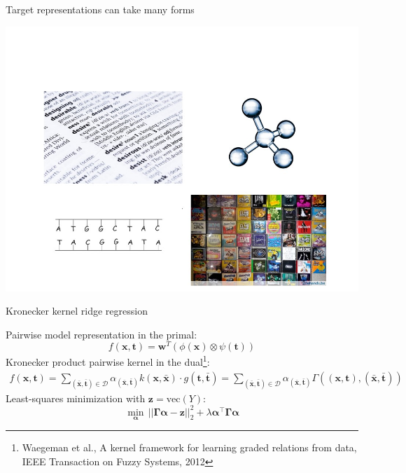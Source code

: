 \documentclass[]{beamer}
\newcommand{\kkernelm}{\bm{\Gamma}}
\newcommand{\regparam}{\lambda}
\newcommand{\transpose}{^\intercal}
\newcommand{\bm}[1]{\mathbf{#1}}
\renewcommand{\vec}[1]{\boldsymbol{#1}}
\begin{document}
\begin{frame}{Target representations can take many forms}

\begin{center}
\includegraphics[width=\textwidth,trim = 0 0 0 90,clip]{Figures/representations}
\end{center}

\end{frame}

\begin{frame}{Kronecker kernel ridge regression}

\vspace{0.5cm}
Pairwise model representation in the primal: 
\begin{equation*}
\label{eq:pairwise}
f(\vec{x},\vec{t}) = \vec{w}^T \left(\phi(\vec{x}) \otimes \psi(\vec{t}) \right) 
\end{equation*}
Kronecker product pairwise kernel in the dual\footnote{Waegeman et al., A kernel framework for learning graded relations from data, IEEE Transaction on Fuzzy Systems, 2012}:
\begin{eqnarray*} 
f(\vec{x},\vec{t})= \sum_{(\bar{\vec{x}},\bar{\vec{t}}) \in \mathcal{D}} \alpha_{(\bar{\vec{x}},\bar{\vec{t}})}  k(\vec{x},\bar{\vec{x}}) \cdot g(\vec{t},\bar{\vec{t}})  = \sum_{(\bar{\vec{x}},\bar{\vec{t}}) \in \mathcal{D}} \alpha_{(\bar{\vec{x}},\bar{\vec{t}})} \Gamma((\vec{x},\vec{t}),(\bar{\vec{x}},\bar{\vec{t}})) 
\end{eqnarray*}
Least-squares minimization with 
$\bm{z} = \textrm{vec}{(Y)}$: 
$$ \min_{\bm{\boldsymbol\alpha}} \, ||\bm{\kkernelm}\bm{\boldsymbol\alpha} -\bm{z} ||^2_2 +\regparam\bm{\boldsymbol\alpha }\transpose\kkernelm\bm{\boldsymbol\alpha} $$


\end{frame}
\end{document}
